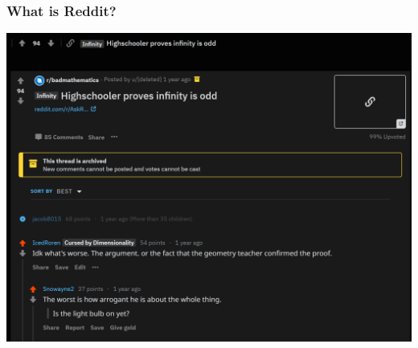 \documentclass[frame number]{beamer}
\begin{document}
\begin{frame}
  \frametitle{What is Reddit?}
  \begin{center}
    \includegraphics[height=0.85\textheight, keepaspectratio=true]{figures/example_submission}
  \end{center}
\end{frame}
\end{document}
